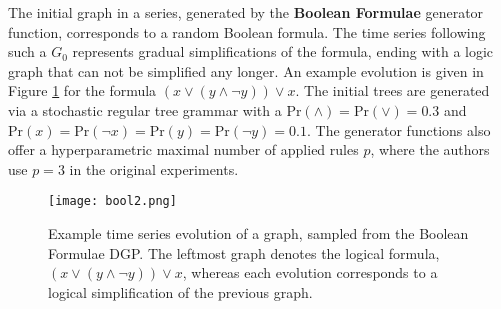 The initial graph in a series, generated by the \textbf{Boolean Formulae} generator function, corresponds to a random Boolean formula. The time series following such a $G_{0}$ represents gradual simplifications of the formula, ending with a logic graph that can not be simplified any longer. An example evolution is given in Figure \ref{fig:bool} for the formula  $(x \lor (y \land \lnot y)) \lor x$. The initial trees are generated via a stochastic regular tree grammar with a $\text{Pr}(\land) = \text{Pr}(\lor) = 0.3$ and $\text{Pr}(x) = \text{Pr}(\lnot x) = \text{Pr}(y) = \text{Pr}(\lnot y) = 0.1$. The generator functions also offer a hyperparametric maximal number of applied rules $p$, where the authors use $p=3$ in the original experiments.

\begin{figure}
    \centering
    \texttt{[image: bool2.png]}
    \caption{Example time series evolution of a graph, sampled from the Boolean Formulae DGP. The leftmost graph denotes the logical formula, $(x \lor (y \land \lnot y)) \lor x$, whereas each evolution corresponds to a logical simplification of the previous graph. }
    \label{fig:bool}
\end{figure}

